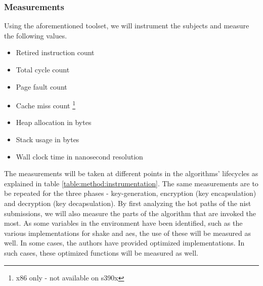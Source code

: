 \noindent
{}

\subsubsection{Measurements}


Using the aforementioned toolset, we will instrument the subjects and measure the following values.

\begin{itemize}
    \item Retired instruction count
    \item Total cycle count
    \item Page fault count
    \item Cache miss count \footnote{x86 only - not available on s390x}
    \item Heap allocation in bytes
    \item Stack usage in bytes
    \item Wall clock time in nanosecond resolution
\end{itemize}

The measurements will be taken at different points in the algorithms' lifecycles as explained in table \ref{table:method:instrumentation}. The same measurements are to be repeated for the three phases - key-generation, encryption (key encapsulation) and decryption (key decapsulation). By first analyzing the hot paths of the \gls{nist} submissions, we will also measure the parts of the algorithm that are invoked the most. As some variables in the environment have been identified, such as the various implementations for \gls{shake} and \gls{aes}, the use of these will be measured as well. In some cases, the authors have provided optimized implementations. In such cases, these optimized functions will be measured as well.

